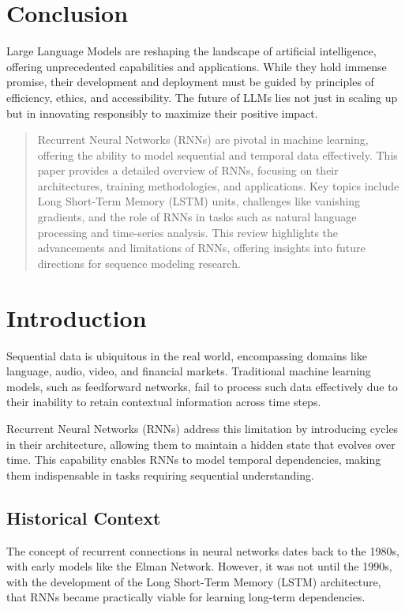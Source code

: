 \section{Conclusion}
Large Language Models are reshaping the landscape of artificial intelligence, offering unprecedented capabilities and applications. While they hold immense promise, their development and deployment must be guided by principles of efficiency, ethics, and accessibility. The future of LLMs lies not just in scaling up but in innovating responsibly to maximize their positive impact.

\maketitle

\begin{abstract}
Recurrent Neural Networks (RNNs) are pivotal in machine learning, offering the ability to model sequential and temporal data effectively. This paper provides a detailed overview of RNNs, focusing on their architectures, training methodologies, and applications. Key topics include Long Short-Term Memory (LSTM) units, challenges like vanishing gradients, and the role of RNNs in tasks such as natural language processing and time-series analysis. This review highlights the advancements and limitations of RNNs, offering insights into future directions for sequence modeling research.
\end{abstract}


\section{Introduction}
Sequential data is ubiquitous in the real world, encompassing domains like language, audio, video, and financial markets. Traditional machine learning models, such as feedforward networks, fail to process such data effectively due to their inability to retain contextual information across time steps.

Recurrent Neural Networks (RNNs) address this limitation by introducing cycles in their architecture, allowing them to maintain a hidden state that evolves over time. This capability enables RNNs to model temporal dependencies, making them indispensable in tasks requiring sequential understanding.

\subsection{Historical Context}
The concept of recurrent connections in neural networks dates back to the 1980s, with early models like the Elman Network. However, it was not until the 1990s, with the development of the Long Short-Term Memory (LSTM) architecture, that RNNs became practically viable for learning long-term dependencies.

